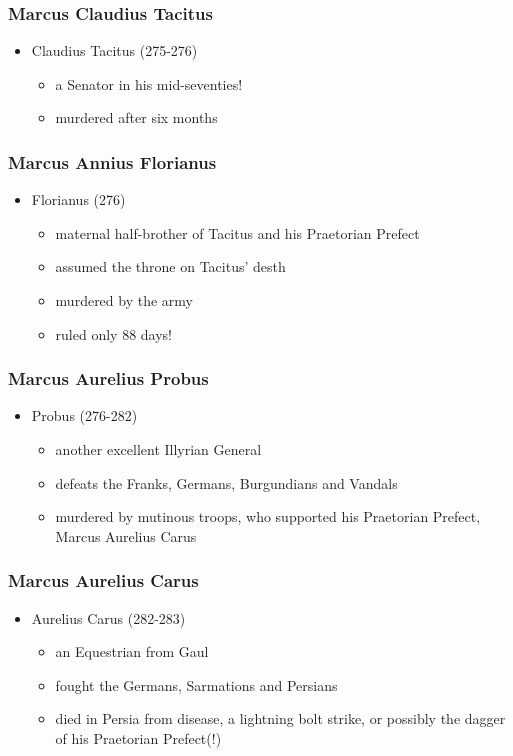 \documentclass[12pt, twoside]{article}
\begin{document}
\subsubsection{Marcus Claudius Tacitus}
\begin{itemize}
\item Claudius Tacitus (275-276)
	\begin{itemize}
	\item a Senator in his mid-seventies!
	\item murdered after six months
	\end{itemize}
\end{itemize}

\subsubsection{Marcus Annius Florianus}
\begin{itemize}
\item Florianus (276)
	\begin{itemize}
	\item maternal half-brother of Tacitus and his Praetorian Prefect
	\item assumed the throne on Tacitus’ desth
	\item murdered by the army
	\item ruled only 88 days!
	\end{itemize}
\end{itemize}

\subsubsection{Marcus Aurelius Probus}
\begin{itemize}
\item Probus (276-282)
	\begin{itemize}
	\item another excellent Illyrian General
	\item defeats the Franks, Germans, Burgundians and Vandals
	\item murdered by mutinous troops, who supported his Praetorian Prefect, Marcus Aurelius Carus 
	\end{itemize}
\end{itemize}

\subsubsection{Marcus Aurelius Carus}
\begin{itemize}
\item Aurelius Carus (282-283)
	\begin{itemize}
	\item an Equestrian from Gaul
	\item fought the Germans, Sarmations and Persians
	\item died in Persia from disease, a lightning bolt strike, or possibly the dagger of his Praetorian Prefect(!)
	\end{itemize}
\end{itemize}
\end{document}
